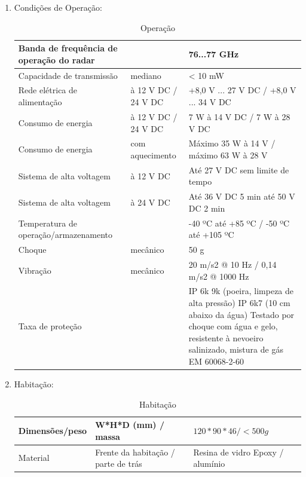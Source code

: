 \begin{enumerate}
\begin{enumerate}
\begin{enumerate}
    \item Condições de Operação:

      \begin{table}[]
      \centering
      \label{habitacao}
      \begin{tabular}{|p{5cm}|l|p{5cm}|}
      \hline
      Banda de frequência de operação do radar &  & 76...77 GHz\\ \hline
      Capacidade de transmissão & mediano & < 10 mW\\ \hline
      Rede elétrica de alimentação & à 12 V DC / 24 V DC & 
+8,0 V ... 27 V DC / +8,0 V ... 34 V DC\\ \hline
      Consumo de energia & à 12 V DC / 24 V DC & 7 W à 14 V DC / 7 W à 28 V DC\\ \hline
      Consumo de energia & com aquecimento & Máximo 35 W à 14 V / máximo 63 W à 28 V\\ \hline
      Sistema de alta voltagem & à 12 V DC & Até 27 V DC sem limite de tempo\\ \hline
      Sistema de alta voltagem & à 24 V DC & Até 36 V DC 5 min até 50 V DC 2 min\\ \hline
      Temperatura de operação/armazenamento & & -40 ºC até +85 ºC / -50 ºC até +105 ºC\\ \hline
      Choque & mecânico & 50 g\\ \hline
      Vibração & mecânico & 20 m/s2 @ 10 Hz / 0,14 m/s2 @ 1000 Hz\\ \hline
      Taxa de proteção & & IP 6k 9k (poeira, limpeza de alta pressão)
IP 6k7 (10 cm abaixo da água)
Testado por choque com água e gelo, resistente à nevoeiro salinizado, mistura de gás EM 60068-2-60\\
      \hline
      \end{tabular}
      \caption{Operação}
      \end{table}

    \item Habitação:
      \begin{table}[]
      \centering
      \label{habitacao}
      \begin{tabular}{|l|l|l|}
      \hline
      Dimensões/peso & W*H*D (mm) / massa & $ 120*90*46 / < 500 g $\\ \hline
      Material       & Frente da habitação / parte de trás & Resina de vidro Epoxy / alumínio \\
      \hline
      \end{tabular}
      \caption{Habitação}
      \end{table}
    

\end{enumerate}
\end{enumerate}
\end{enumerate}
